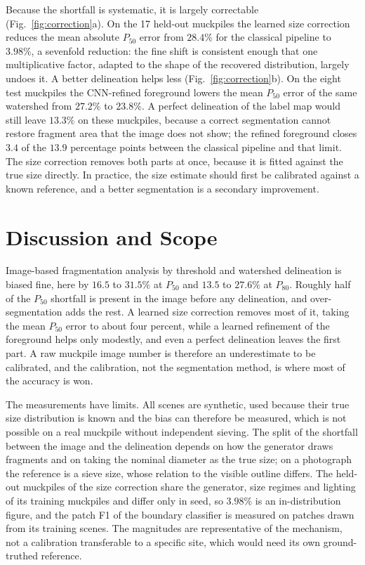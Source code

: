\documentclass[journal]{IEEEtran}
\begin{document}
Because the shortfall is systematic, it is largely correctable (Fig.~\ref{fig:correction}a). On the 17 held-out
muckpiles the learned size correction reduces the mean absolute $P_{50}$ error from $28.4\%$ for the classical
pipeline to $3.98\%$, a sevenfold reduction: the fine shift is consistent enough that one multiplicative factor,
adapted to the shape of the recovered distribution, largely undoes it. A better delineation helps less
(Fig.~\ref{fig:correction}b). On the eight test muckpiles the CNN-refined foreground lowers the mean $P_{50}$ error of
the same watershed from $27.2\%$ to $23.8\%$. A perfect delineation of the label map would still leave $13.3\%$ on
these muckpiles, because a correct segmentation cannot restore fragment area that the image does not show; the
refined foreground closes $3.4$ of the $13.9$ percentage points between the classical pipeline and that limit. The
size correction removes both parts at once, because it is fitted against the true size directly. In practice, the
size estimate should first be calibrated against a known reference, and a better segmentation is a secondary
improvement.

\section{Discussion and Scope}\label{sec:discuss}

Image-based fragmentation analysis by threshold and watershed delineation is biased fine, here by $16.5$ to $31.5\%$
at $P_{50}$ and $13.5$ to $27.6\%$ at $P_{80}$. Roughly half of the $P_{50}$ shortfall is present in the image before
any delineation, and over-segmentation adds the rest. A learned size correction removes most of it, taking the mean
$P_{50}$ error to about four percent, while a learned refinement of the foreground helps only modestly, and even a
perfect delineation leaves the first part. A raw muckpile image number is therefore an underestimate to
be calibrated, and the calibration, not the segmentation method, is where most of the accuracy is won.

The measurements have limits. All scenes are synthetic, used because their true size distribution is known and the
bias can therefore be measured, which is not possible on a real muckpile without independent sieving. The split of
the shortfall between the image and the delineation depends on how the generator draws fragments and on taking the
nominal diameter as the true size; on a photograph the reference is a sieve size, whose relation to the visible
outline differs. The held-out muckpiles of the size correction share the generator, size regimes and lighting of its
training muckpiles and differ only in seed, so $3.98\%$ is an in-distribution figure, and the patch F1 of the
boundary classifier is measured on patches drawn from its training scenes. The magnitudes are representative of the
mechanism, not a calibration transferable to a specific site, which would need its own ground-truthed reference.
\end{document}
